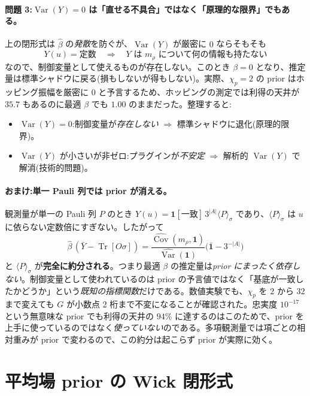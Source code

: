 \documentclass[11pt,a4paper]{ltjsarticle}
\newcommand{\ev}[1]{\langle #1\rangle}
\newcommand{\Tr}{\operatorname{Tr}}
\newcommand{\Var}{\operatorname{Var}}
\newcommand{\Cov}{\operatorname{Cov}}
\begin{document}
\paragraph{問題 3:$\Var(Y)=0$ は「直せる不具合」ではなく「原理的な限界」でもある。}
上の閉形式は $\hat\beta$ の\emph{発散}を防ぐが、$\Var(Y)$ が厳密に $0$ ならそもそも
\begin{equation}
  Y(u)=\text{定数} \quad\Longrightarrow\quad Y \text{ は } m_\rho \text{ について何の情報も持たない}
\end{equation}
なので、制御変量として使えるものが存在しない。このとき $\beta=0$ となり、推定量は標準シャドウに戻る(損もしないが得もしない)。実際、$\chi_p=2$ の prior はホッピング振幅を厳密に $0$ と予言するため、ホッピングの測定では利得の天井が $35.7$ もあるのに最適 $\beta$ でも $1.00$ のままだった。整理すると:
\begin{itemize}
  \item $\Var(Y)=0$:制御変量が\emph{存在しない} $\Rightarrow$ 標準シャドウに退化(原理的限界)。
  \item $\Var(Y)$ が小さいが非ゼロ:プラグインが\emph{不安定} $\Rightarrow$ 解析的 $\Var(Y)$ で解消(技術的問題)。
\end{itemize}

\paragraph{おまけ:単一 Pauli 列では prior が消える。}
観測量が単一の Pauli 列 $P$ のとき $Y(u)=\mathbf 1[\text{一致}]\,3^{|A|}\ev{P}_\sigma$ であり、$\ev{P}_\sigma$ は $u$ に依らない定数倍にすぎない。したがって
\begin{equation}
  \hat\beta\,(\bar Y-\Tr[O\sigma])
  = \frac{\widehat{\Cov}(m_\rho,\mathbf 1)}{\widehat{\Var}(\mathbf 1)}\bigl(\bar{\mathbf 1}-3^{-|A|}\bigr)
\end{equation}
と $\ev{P}_\sigma$ が\textbf{完全に約分される}。つまり最適 $\beta$ の推定量は\emph{prior にまったく依存しない}。制御変量として使われているのは prior の予言値ではなく「基底が一致したかどうか」という\emph{既知の指標関数}だけである。数値実験でも、$\chi_p$ を $2$ から $32$ まで変えても $G$ が小数点 2 桁まで不変になることが確認された。忠実度 $10^{-17}$ という無意味な prior でも利得の天井の $94\%$ に達するのはこのためで、prior を上手に使っているのではなく\emph{使っていない}のである。多項観測量では項ごとの相対重みが prior で変わるので、この約分は起こらず prior が実際に効く。

\section{平均場 prior の Wick 閉形式}
\label{sec:wickderive}
\end{document}
